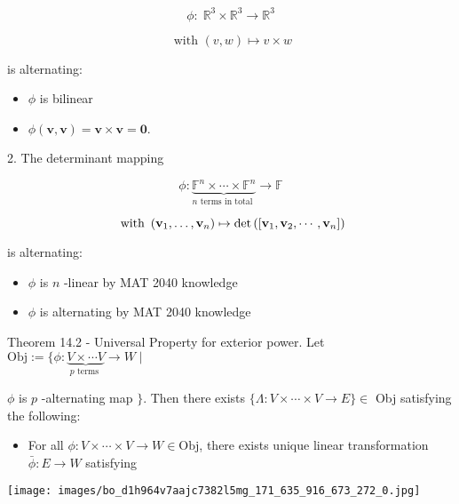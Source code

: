 \documentclass[11pt]{article}
\begin{document}
\[
\phi  : \;{\mathbb{R}}^{3} \times  {\mathbb{R}}^{3} \rightarrow  {\mathbb{R}}^{3}
\]

\[
\text{ with }\left( {v,w}\right)  \mapsto  v \times  w
\]

is alternating:

\begin{itemize}
\item \(\phi\) is bilinear
\end{itemize}

\begin{itemize}
\item \(\phi \left( {\mathbf{v},\mathbf{v}}\right)  = \mathbf{v} \times  \mathbf{v} = \mathbf{0}\).
\end{itemize}

2. The determinant mapping

\[
\phi  : \underset{n\text{ terms in total }}{\underbrace{{\mathbb{F}}^n \times  \cdots  \times  {\mathbb{F}}^n}} \rightarrow  \mathbb{F}
\]

\[
\text{ with }\left( {{\bf v}_1,\ldots ,{\bf v}_n}\right)  \mapsto  \det \left( \left\lbrack  {{\bf v}_1,{\bf v}_2,\cdots ,{\bf v}_n}\right\rbrack  \right)
\]

is alternating:

\begin{itemize}
\item \(\phi\) is \(n\) -linear by MAT 2040 knowledge
\end{itemize}

\begin{itemize}
\item \(\phi\) is alternating by MAT 2040 knowledge
\end{itemize}

Theorem 14.2 - Universal Property for exterior power. Let \(\mathrm{{Obj}} \mathrel{\text{ := }} \{ \phi  : \underset{p\text{ terms }}{\underbrace{V \times  \cdots V}} \rightarrow  W \mid\)

\(\phi\) is \(p\) -alternating map \(\}\). Then there exists \(\{ \Lambda  : V \times  \cdots  \times  V \rightarrow  E\}  \in\) Obj satisfying the following:

\begin{itemize}
\item For all \(\phi  : V \times  \cdots  \times  V \rightarrow  W \in  \mathrm{{Obj}}\), there exists unique linear transformation \(\bar{\phi } : E \rightarrow  W\) satisfying
\end{itemize}

\begin{center}
\texttt{[image: images/bo\_d1h964v7aajc7382l5mg\_171\_635\_916\_673\_272\_0.jpg]}
\end{center}
\hspace*{3em} 
\end{document}

